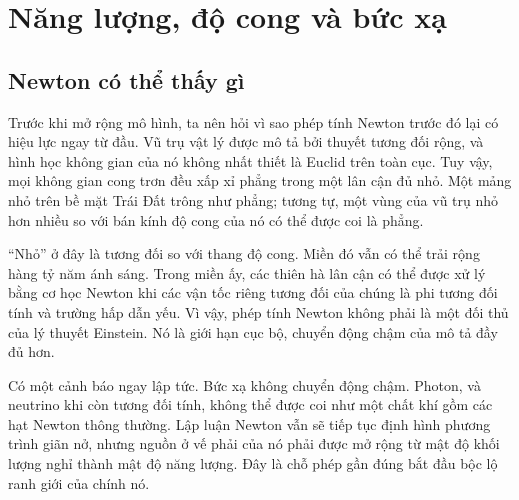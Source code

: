 \chapter{Năng lượng, độ cong và bức xạ}


\section{Newton có thể thấy gì}

Trước khi mở rộng mô hình, ta nên hỏi vì sao phép tính Newton trước đó lại có hiệu lực ngay từ đầu. Vũ trụ vật lý được mô tả bởi thuyết tương đối rộng, và hình học không gian của nó không nhất thiết là Euclid trên toàn cục. Tuy vậy, mọi không gian cong trơn đều xấp xỉ phẳng trong một lân cận đủ nhỏ. Một mảng nhỏ trên bề mặt Trái Đất trông như phẳng; tương tự, một vùng của vũ trụ nhỏ hơn nhiều so với bán kính độ cong của nó có thể được coi là phẳng.

``Nhỏ'' ở đây là tương đối so với thang độ cong. Miền đó vẫn có thể trải rộng hàng tỷ năm ánh sáng. Trong miền ấy, các thiên hà lân cận có thể được xử lý bằng cơ học Newton khi các vận tốc riêng tương đối của chúng là phi tương đối tính và trường hấp dẫn yếu. Vì vậy, phép tính Newton không phải là một đối thủ của lý thuyết Einstein. Nó là giới hạn cục bộ, chuyển động chậm của mô tả đầy đủ hơn.

Có một cảnh báo ngay lập tức. Bức xạ không chuyển động chậm. Photon, và neutrino khi còn tương đối tính, không thể được coi như một chất khí gồm các hạt Newton thông thường. Lập luận Newton vẫn sẽ tiếp tục định hình phương trình giãn nở, nhưng nguồn ở vế phải của nó phải được mở rộng từ mật độ khối lượng nghỉ thành mật độ năng lượng. Đây là chỗ phép gần đúng bắt đầu bộc lộ ranh giới của chính nó.

